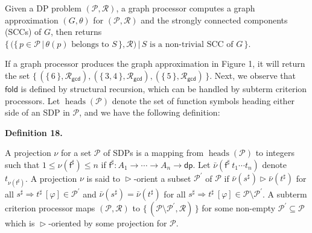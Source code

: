 \documentclass[10pt,a4paper]{amsart}
\begin{document}
 
Given a DP problem $(\mathcal{P},\mathcal{R})$, a graph processor computes a graph approximation $(G,\theta)$ for $(\mathcal{P},\mathcal{R})$ and the strongly connected components (SCCs) of $G$, then returns $\{\,(\{\,p\in\mathcal{P}\,|\,\theta(p)\text{ belongs to }S\,\},\mathcal{R})\,|\,S\text{ is a non-trivial SCC of }G\,\}$.\par
 
 
 
 
If a graph processor produces the graph approximation in Figure 1, it will return the set $\{\,(\{\,\text{6}\,\},\mathcal{R}_{\mathsf{gcd}}),(\{\,\text{3},\text{4}\,\},\mathcal{R}_{\mathsf{gcd}}),(\{\,\text{5}\,\},\mathcal{R}_{\mathsf{gcd}})\,\}$. Next, we observe that $\mathsf{fold}$ is defined by structural recursion, which can be handled by subterm criterion processors. Let $\operatorname{heads}(\mathcal{P})$ denote the set of function symbols heading either side of an SDP in $\mathcal{P}$, and we have the following definition:\par
 
 
 
\par\medskip\noindent\textbf{Definition 18.}\par
 
 
A projection $\nu$ for a set $\mathcal{P}$ of SDPs is a mapping from $\operatorname{heads}(\mathcal{P})$ to integers such that $1\leq\nu(\mathsf{f}^{\sharp})\leq n$ if $\mathsf{f}^{\sharp}:{A}_{1}\rightarrow\cdots\rightarrow{A}_{n}\rightarrow\mathsf{dp}$. Let $\bar{\nu}({\mathsf{f}^{\sharp}}\ {{t}_{1}\cdots{t}_{n}})$ denote $t_{\nu(\mathsf{f}^{\sharp})}$. A projection $\nu$ is said to $\vartriangleright$-orient a subset $\mathcal{P}^{\prime}$ of $\mathcal{P}$ if $\bar{\nu}(s^{\sharp})\vartriangleright\bar{\nu}(t^{\sharp})$ for all ${s^{\sharp}}\Rightarrow{t^{\sharp}}\ [\varphi]\in\mathcal{P}^{\prime}$ and $\bar{\nu}(s^{\sharp})=\bar{\nu}(t^{\sharp})$ for all ${s^{\sharp}}\Rightarrow{t^{\sharp}}\ [\varphi]\in\mathcal{P}\setminus\mathcal{P}^{\prime}$. A subterm criterion processor maps $(\mathcal{P},\mathcal{R})$ to $\{\,(\mathcal{P}\setminus\mathcal{P}^{\prime},\mathcal{R})\,\}$ for some non-empty $\mathcal{P}^{\prime}\subseteq\mathcal{P}$ which is $\vartriangleright$-oriented by some projection for $\mathcal{P}$.\par
 
\end{document}
